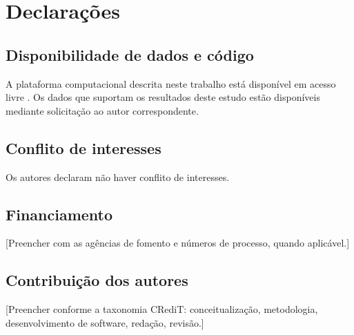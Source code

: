 \section*{Declarações}

\subsection*{Disponibilidade de dados e código}
A plataforma computacional descrita neste trabalho está disponível em acesso livre \parencite{ReliaBridge2026}. Os dados que suportam os resultados deste estudo estão disponíveis mediante solicitação ao autor correspondente.

\subsection*{Conflito de interesses}
Os autores declaram não haver conflito de interesses.

\subsection*{Financiamento}
[Preencher com as agências de fomento e números de processo, quando aplicável.]

\subsection*{Contribuição dos autores}
[Preencher conforme a taxonomia CRediT: conceitualização, metodologia, desenvolvimento de software, redação, revisão.]
